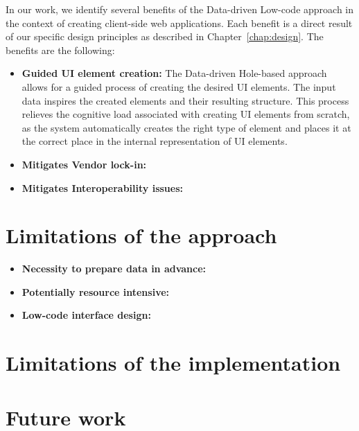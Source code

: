 In our work, we identify several benefits of the Data-driven Low-code approach in the context of creating client-side web applications.
Each benefit is a direct result of our specific design principles as described in Chapter~\ref{chap:design}.
The benefits are the following:
\begin{itemize}
	\item \textbf{Guided UI element creation:} The Data-driven Hole-based approach allows for a guided process of creating the desired UI elements.
	      The input data inspires the created elements and their resulting structure.
	      This process relieves the cognitive load associated with creating UI elements from scratch, as the system automatically creates the right type
	      of element and places it at the correct place in the internal representation of UI elements.
	\item \textbf{Mitigates Vendor lock-in:}
	\item \textbf{Mitigates Interoperability issues:}
\end{itemize}


\section{Limitations of the approach}

\begin{itemize}
	\item \textbf{Necessity to prepare data in advance:}
	\item \textbf{Potentially resource intensive:}
	\item \textbf{Low-code interface design:}
\end{itemize}

\section{Limitations of the implementation}

\section{Future work}

